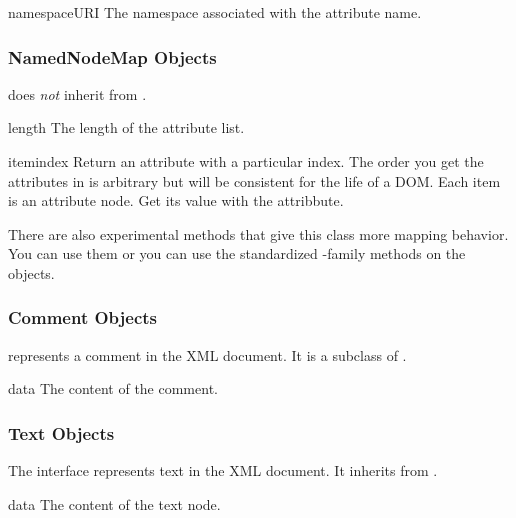 \begin{memberdesc}[Attr]{namespaceURI}
The namespace associated with the attribute name.
\end{memberdesc}


\subsubsection{NamedNodeMap Objects \label{dom-attributelist-objects}}

 does \emph{not} inherit from .

\begin{memberdesc}[NamedNodeMap]{length}
The length of the attribute list.
\end{memberdesc}

\begin{methoddesc}[NamedNodeMap]{item}{index}
Return an attribute with a particular index.  The order you get the
attributes in is arbitrary but will be consistent for the life of a
DOM.  Each item is an attribute node.  Get its value with the
 attribbute.
\end{methoddesc}

There are also experimental methods that give this class more mapping
behavior.  You can use them or you can use the standardized
-family methods on the  objects.


\subsubsection{Comment Objects \label{dom-comment-objects}}

 represents a comment in the XML document.  It is a
subclass of .

\begin{memberdesc}[Comment]{data}
The content of the comment.
\end{memberdesc}


\subsubsection{Text Objects \label{dom-text-objects}}

The  interface represents text in the XML document.  It
inherits from .

\begin{memberdesc}[Text]{data}
The content of the text node.
\end{memberdesc}


